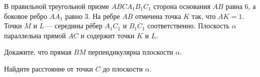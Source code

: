 \begin{ex}
	\begin{condition}
		В правильной треугольной призме \( ABCA_1B_1C_1 \) сторона основания \( AB \) равна \( 6 \), а боковое ребро \( AA_1 \) равно \( 3 \). На ребре \( AB \) отмечена точка \( K \) так, что \( AK = 1 \). Точки \( M \) и \( L \) — середины рёбер \( A_1C_1 \) и \( B_1C_1 \) соответственно. Плоскость \( \alpha \) параллельна прямой \( AC \) и содержит точки \( K \) и \( L \).
		\begin{enumcols}[label=\asbuk*)]
			\item Докажите, что прямая \( BM \) перпендикулярна плоскости \( \alpha \).
			\item Найдите расстояние от точки \( C \) до плоскости \( \alpha \).
		\end{enumcols}
	\end{condition}
\end{ex}